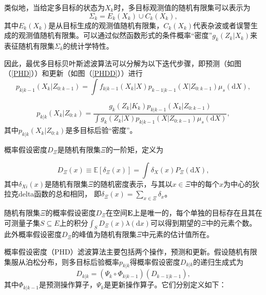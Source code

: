 类似地，当给定多目标的状态为$X_k$时，多目标观测值的随机有限集可以表示为
\begin{equation}
\Sigma_k = E_k(X_k) \cup C_k(X_k),
\end{equation}
其中$E_k(X_k)$是从目标生成的观测值随机有限集，$C_k(X_k)$代表杂波或者误警生成的观测值随机有限集。可以通过似然函数形式的条件概率“密度”$ g_k(Z_k|X_k)$来表征随机有限集$\Sigma_k$的统计学特性。

因此，最优多目标贝叶斯滤波算法可以分解为以下迭代步骤，即预测（如图（\ref{PHD}））和更新（如图（\ref{PHDD}））进行
\begin{equation}\label{PHD}
  p_{k|k-1}(X_k|Z_{0:k-1}) = \int f_{k|k-1}(X_k|X)p_{k-1|k-1}(X|Z_{0:k-1}) \mu_s(\mathrm{d}X),
\end{equation}

\begin{equation}\label{PHDD}
p_{k|k}(X_k|Z_{0:k}) = \frac{g_k(Z_k|K_k)p_{k|k-1}(X_k|Z_{0:k-1})}{\int g_k(Z_k|X)p_{k|k-1}(X|Z_{0:k-1}) \mu_s(\mathrm{d}X)},
\end{equation}
其中$p_{k|k}(X_k|Z_{0:k})$是多目标后验“密度”。

概率假设密度$D_{\Xi}$是随机有限集$\Xi$的一阶矩，定义为

\begin{equation}\label{Eq:phd}
  D_{\Xi}(x) \equiv \mathbb{E}[\delta_{\Xi}(x)]=\int \delta_{X}(x)P_{\Xi}(\mathrm{d}X),
\end{equation}
其中$\delta_{Xi}(x)$是随机有限集$\Xi$的随机密度表示，与其以$x\in \Xi$中的每个$x$为中心的狄拉克delta函数的总和相同，
即$\delta_{\Xi}(x) = \sum_{x \in \Xi} \delta_x$。

随机有限集$\Xi$的概率假设密度$D_{\Xi}$在空间$\mathbf{E}$上是唯一的，每个单独的目标存在且其在可测量子集$S\subseteq E$上的积分$\int_{S}D_{\Xi}(x)\lambda(\mathrm{d}x)$可以得到期望的$\Xi$中的元素个数。此外概率假设密度$D_{\Xi}$的峰值为随机有限集$\Xi$中元素的估计值所在。

概率假设密度（PHD）滤波算法主要包括两个操作，预测和更新。假设随机有限集服从泊松分布，则多目标后验概率$p_{k|k}$得概率假设密度$D_{k|k}$的递归生成式为
\begin{equation}\label{Eq:PHD01}
  D_{k|k} = (\Psi_k \circ \Phi_{k|k-1})(D_{k-1|k-1}),
\end{equation}
其中$\Phi_{k|k-1}$是预测操作算子，$\Psi_k$是更新操作算子。它们分别定义如下：

